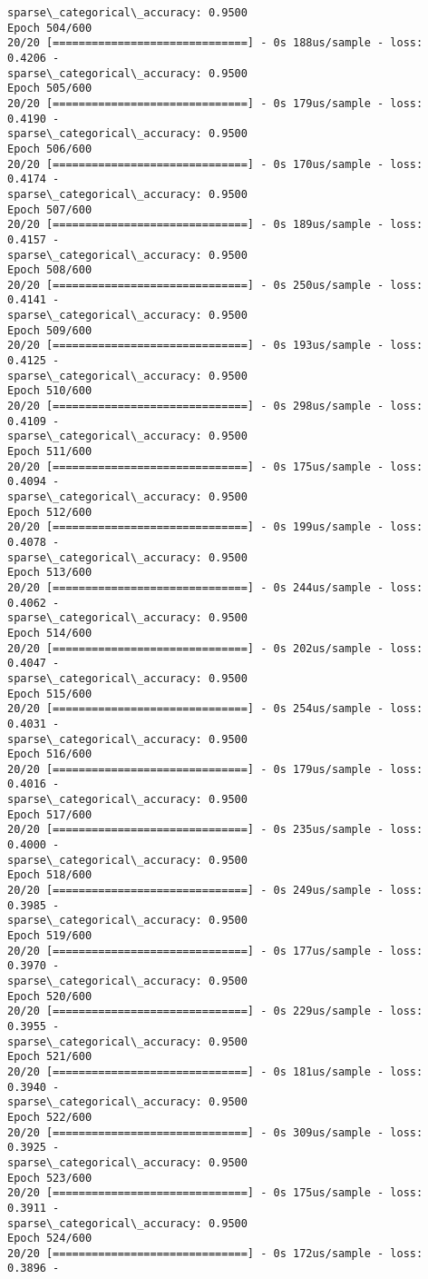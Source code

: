 \documentclass[11pt]{article}
\begin{document}
\begin{Verbatim}[commandchars=\\\{\}]
sparse\_categorical\_accuracy: 0.9500
Epoch 504/600
20/20 [==============================] - 0s 188us/sample - loss: 0.4206 -
sparse\_categorical\_accuracy: 0.9500
Epoch 505/600
20/20 [==============================] - 0s 179us/sample - loss: 0.4190 -
sparse\_categorical\_accuracy: 0.9500
Epoch 506/600
20/20 [==============================] - 0s 170us/sample - loss: 0.4174 -
sparse\_categorical\_accuracy: 0.9500
Epoch 507/600
20/20 [==============================] - 0s 189us/sample - loss: 0.4157 -
sparse\_categorical\_accuracy: 0.9500
Epoch 508/600
20/20 [==============================] - 0s 250us/sample - loss: 0.4141 -
sparse\_categorical\_accuracy: 0.9500
Epoch 509/600
20/20 [==============================] - 0s 193us/sample - loss: 0.4125 -
sparse\_categorical\_accuracy: 0.9500
Epoch 510/600
20/20 [==============================] - 0s 298us/sample - loss: 0.4109 -
sparse\_categorical\_accuracy: 0.9500
Epoch 511/600
20/20 [==============================] - 0s 175us/sample - loss: 0.4094 -
sparse\_categorical\_accuracy: 0.9500
Epoch 512/600
20/20 [==============================] - 0s 199us/sample - loss: 0.4078 -
sparse\_categorical\_accuracy: 0.9500
Epoch 513/600
20/20 [==============================] - 0s 244us/sample - loss: 0.4062 -
sparse\_categorical\_accuracy: 0.9500
Epoch 514/600
20/20 [==============================] - 0s 202us/sample - loss: 0.4047 -
sparse\_categorical\_accuracy: 0.9500
Epoch 515/600
20/20 [==============================] - 0s 254us/sample - loss: 0.4031 -
sparse\_categorical\_accuracy: 0.9500
Epoch 516/600
20/20 [==============================] - 0s 179us/sample - loss: 0.4016 -
sparse\_categorical\_accuracy: 0.9500
Epoch 517/600
20/20 [==============================] - 0s 235us/sample - loss: 0.4000 -
sparse\_categorical\_accuracy: 0.9500
Epoch 518/600
20/20 [==============================] - 0s 249us/sample - loss: 0.3985 -
sparse\_categorical\_accuracy: 0.9500
Epoch 519/600
20/20 [==============================] - 0s 177us/sample - loss: 0.3970 -
sparse\_categorical\_accuracy: 0.9500
Epoch 520/600
20/20 [==============================] - 0s 229us/sample - loss: 0.3955 -
sparse\_categorical\_accuracy: 0.9500
Epoch 521/600
20/20 [==============================] - 0s 181us/sample - loss: 0.3940 -
sparse\_categorical\_accuracy: 0.9500
Epoch 522/600
20/20 [==============================] - 0s 309us/sample - loss: 0.3925 -
sparse\_categorical\_accuracy: 0.9500
Epoch 523/600
20/20 [==============================] - 0s 175us/sample - loss: 0.3911 -
sparse\_categorical\_accuracy: 0.9500
Epoch 524/600
20/20 [==============================] - 0s 172us/sample - loss: 0.3896 -

\end{Verbatim}
\end{document}
